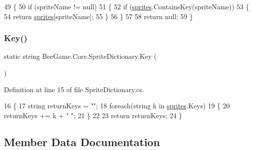 \begin{DoxyCode}
49         \{
50             \textcolor{keywordflow}{if} (spriteName != null)
51             \{
52                 \textcolor{keywordflow}{if} (\hyperlink{class_bee_game_1_1_core_1_1_sprite_dictionary_a40c5e9e2f9f25548971faadbbbde4529}{sprites}.ContainsKey(spriteName))
53                 \{
54                     \textcolor{keywordflow}{return} \hyperlink{class_bee_game_1_1_core_1_1_sprite_dictionary_a40c5e9e2f9f25548971faadbbbde4529}{sprites}[spriteName];
55                 \}
56             \}
57             
58             \textcolor{keywordflow}{return} null;
59         \}
\end{DoxyCode}
\mbox{\label{class_bee_game_1_1_core_1_1_sprite_dictionary_ae4d45a1450cc2a99493ca8aee6ebaab6}} 
\subsubsection{\texorpdfstring{Key()}{Key()}}
{\footnotesize\ttfamily static string Bee\+Game.\+Core.\+Sprite\+Dictionary.\+Key (\begin{DoxyParamCaption}{ }\end{DoxyParamCaption})\hspace{0.3cm}{\ttfamily [static]}}



Definition at line 15 of file Sprite\+Dictionary.\+cs.


\begin{DoxyCode}
16         \{
17             \textcolor{keywordtype}{string} returnKeys = \textcolor{stringliteral}{""};
18             \textcolor{keywordflow}{foreach}(\textcolor{keywordtype}{string} k \textcolor{keywordflow}{in} \hyperlink{class_bee_game_1_1_core_1_1_sprite_dictionary_a40c5e9e2f9f25548971faadbbbde4529}{sprites}.Keys)
19             \{
20                 returnKeys += k + \textcolor{stringliteral}{" "};
21             \}
22 
23             \textcolor{keywordflow}{return} returnKeys;
24         \}
\end{DoxyCode}


\subsection{Member Data Documentation}
\mbox{\label{class_bee_game_1_1_core_1_1_sprite_dictionary_a40c5e9e2f9f25548971faadbbbde4529}} 
